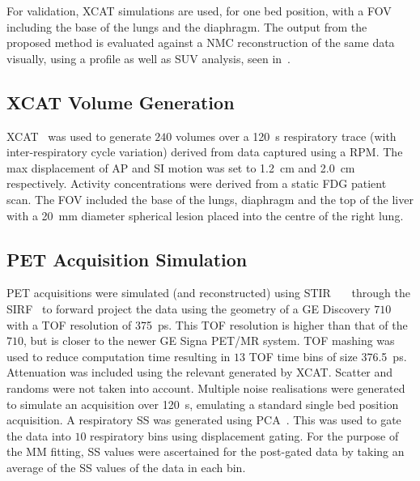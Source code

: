             For validation, \gls{XCAT} simulations are used, for one bed position, with a \gls{FOV} including the base of the lungs and the diaphragm. The output from the proposed method is evaluated against a \gls{NMC} reconstruction of the same data visually, using a profile as well as \gls{SUV} analysis, seen in~.
            
            \subsection{XCAT Volume Generation} \label{sec:pet_ct_respiratory_motion_correction_with_a_single_attenuation_map_using_nac_derived_deformation_fields_methods_xcat_volume_generation} \gls{XCAT}~ was used to generate $240$ volumes over a \SI{120}{\second} respiratory trace (with inter-respiratory cycle variation) derived from data captured using a \gls{RPM}. The max displacement of \gls{AP} and \gls{SI} motion was set to \SI{1.2}{\centi\metre} and \SI{2.0}{\centi\metre} respectively. Activity concentrations were derived from a static \gls{FDG} patient scan. The \gls{FOV} included the base of the lungs, diaphragm and the top of the liver with a \SI{20}{\milli\metre} diameter spherical lesion placed into the centre of the right lung.
    
            \subsection{PET Acquisition Simulation} \label{sec:pet_ct_respiratory_motion_correction_with_a_single_attenuation_map_using_nac_derived_deformation_fields_methods_pet_acquisition_simulation}
                \gls{PET} acquisitions were simulated (and reconstructed) using \gls{STIR}~~~ through the \gls{SIRF}~ to forward project the data using the geometry of a \gls{GE} Discovery $710$ with a \gls{TOF} resolution of \SI{375}{\pico\second}. This \gls{TOF} resolution is higher than that of the $710$, but is closer to the newer \gls{GE} Signa \gls{PET}/MR system. \gls{TOF} mashing was used to reduce computation time resulting in $13$ \gls{TOF} time bins of size \SI{376.5}{\pico\second}. Attenuation was included using the relevant  generated by \gls{XCAT}. Scatter and randoms were not taken into account. Multiple noise realisations were generated to simulate an acquisition over \SI{120}{\second}, emulating a standard single bed position acquisition. A respiratory \gls{SS} was generated using \gls{PCA}~. This was used to gate the data into $10$ respiratory bins using displacement gating. For the purpose of the \gls{MM} fitting, \gls{SS} values were ascertained for the post-gated data by taking an average of the \gls{SS} values of the data in each bin.
            

